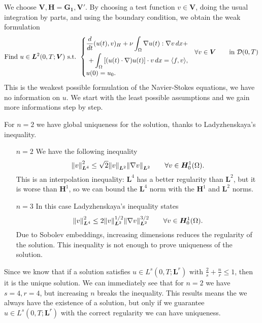 \begin{remark}
    We choose \(\bm{V}, \bm{H} = \bm{G_1}, \bm{V'}\). By choosing a test function \(v \in \bm{V}\), doing the usual integration by parts, and using the boundary condition, we obtain the weak formulation
    \begin{equation*}
        \text{Find } u \in \bm{L}^2(0,T;\bm{V}) \text{ s.t. }
        \begin{cases}
            \begin{aligned}
                \frac{d}{dt}(u(t), v)_H + \nu \int_\Omega \nabla u(t) : \nabla v \, dx + \\
                + \int_\Omega \left[ (u(t) \cdot \nabla) u(t)\right] \cdot v \, dx = \langle f, v \rangle,
            \end{aligned} & \forall v \in \bm{V} \qquad \text{in } \mathcal{D}(0,T) \\
            u(0) = u_0.
        \end{cases}
    \end{equation*}
    This is the weakest possible formulation of the Navier-Stokes equations, we have no information on \(u\). We start with the least possible assumptions and we gain more informations step by step.
\end{remark}
For \(n=2\) we have global uniqueness for the solution, thanks to Ladyzhenskaya's inequality.
\begin{itemize}
    \item[\(n=2\)] We have the following inequality
          \[
              \norm{v}^2_{\bm{L}^4} \leq \sqrt{2} \norm{v}_{\bm{L}^2} \norm{\nabla v}_{\bm{L}^2} \qquad \forall v \in \bm{H}^1_0(\Omega).
          \]
          This is an interpolation inequality: \(\bm{L}^4\) has a better regularity than
          \(\bm{L}^2\), but it is worse than \(\bm{H}^1\), so we can bound the
          \(\bm{L}^4\) norm with the \(\bm{H}^1\) and \(\bm{L}^2\) norms.
    \item[\(n=3\)] In this case Ladyzhenskaya's inequality states
          \[
              \norm{v}^2_{\bm{L}^4} \leq 2 \norm{v}_{\bm{L}^2}^{1/2} \norm{\nabla v}_{\bm{L}^2}^{3/2} \qquad \forall v \in \bm{H}^1_0(\Omega).
          \]
          Due to Sobolev embeddings, increasing dimensions reduces the regularity of the
          solution. This inequality is not enough to prove uniqueness of the solution.
\end{itemize}
Since we know that if a solution satisfies \(u \in L^s(0,T;\bm{L}^r) \text{ with } \frac{2}{s}+\frac{n}{r} \leq 1\), then it is the unique solution. We can immediately see that for \(n=2\) we have \(s=4, r=4\), but increasing \(n\) breaks the inequality. This results means the we always have the existence of a solution, but only if we guarantee \(u \in L^s(0,T;\bm{L}^r)\) with the correct regularity we can have uniqueness.

